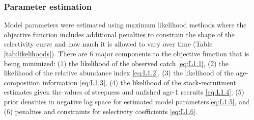 \documentclass[review,letterpaper,10pt,authoryear]{elsarticle}
\begin{document}
\subsubsection*{Parameter estimation} %
\label{ssub:parameter_estimation}
Model parameters were estimated using maximum likelihood methods where the objective function includes additional penalties to constrain the shape of the selectivity curve and how much it is allowed to vary over time (Table \ref{tab:likelihoods}). There are 6 major components to the objective function that is being minimized: (1) the likelihood of the observed catch \eqref{eq:L1.1}, (2) the likelihood of the relative abundance index \eqref{eq:L1.2}, (3) the likelihood of the age-composition information \eqref{eq:L1.3}, (4) the likelihood of the stock-recruitment estimates given the values of steepness and unfished age-1 recruits \eqref{eq:L1.4}, (5) prior densities in negative log space for estimated model parameters\eqref{eq:L1.5}, and (6) penalties and constraints for selectivity coefficients \eqref{eq:L1.6}.  
\end{document}
